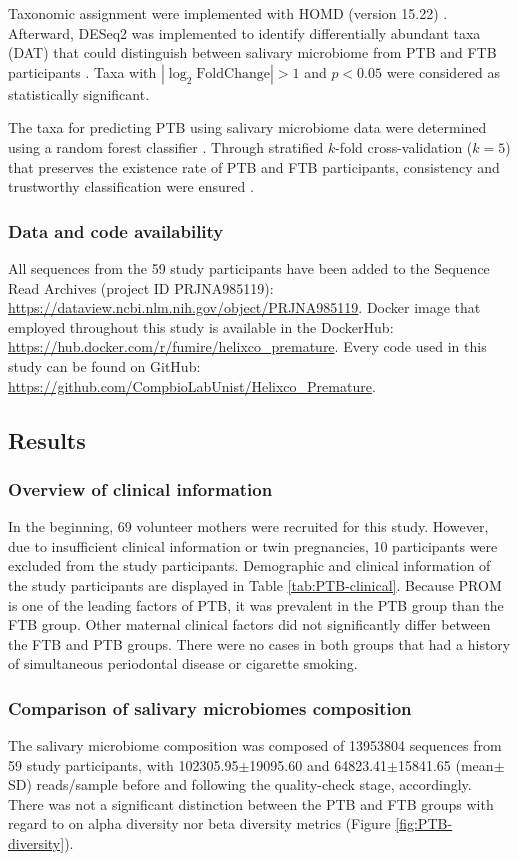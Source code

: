 \documentclass[11pt, a4paper, onecolumn, oneside]{report}
\begin{document}
                Taxonomic assignment were implemented with HOMD (version 15.22) \cite{HOMD-1}. Afterward, DESeq2 was implemented to identify differentially abundant taxa (DAT) that could distinguish between salivary microbiome from PTB and FTB participants \cite{DESeq2-1}. Taxa with $| \log _2 \textrm{FoldChange} | > 1$ and $p < 0.05$ were considered as statistically significant.

                The taxa for predicting PTB using salivary microbiome data were determined using a random forest classifier \cite{RF-1}. Through stratified $k$-fold cross-validation ($k=5$) that preserves the existence rate of PTB and FTB participants, consistency and trustworthy classification were ensured \cite{Kfold-1}.

            \subsubsection{Data and code availability}
                All sequences from the 59 study participants have been added to the Sequence Read Archives (project ID PRJNA985119): \url{https://dataview.ncbi.nlm.nih.gov/object/PRJNA985119}. Docker image that employed throughout this study is available in the DockerHub: \url{https://hub.docker.com/r/fumire/helixco_premature}. Every code used in this study can be found on GitHub: \url{https://github.com/CompbioLabUnist/Helixco_Premature}.
        \newpage

        \subsection{Results}
            \subsubsection{Overview of clinical information}
                In the beginning, 69 volunteer mothers were recruited for this study. However, due to insufficient clinical information or twin pregnancies, 10 participants were excluded from the study participants. Demographic and clinical information of the study participants are displayed in Table \ref{tab:PTB-clinical}. Because PROM is one of the leading factors of PTB, it was prevalent in the PTB group than the FTB group. Other maternal clinical factors did not significantly differ between the FTB and PTB groups. There were no cases in both groups that had a history of simultaneous periodontal disease or cigarette smoking.

            \subsubsection{Comparison of salivary microbiomes composition}
                The salivary microbiome composition was composed of 13953804 sequences from 59 study participants, with 102305.95$\pm$19095.60 and 64823.41$\pm$15841.65 (mean$\pm$SD) reads/sample before and following the quality-check stage, accordingly. There was not a significant distinction between the PTB and FTB groups with regard to on alpha diversity nor beta diversity metrics (Figure \ref{fig:PTB-diversity}).
\end{document}
